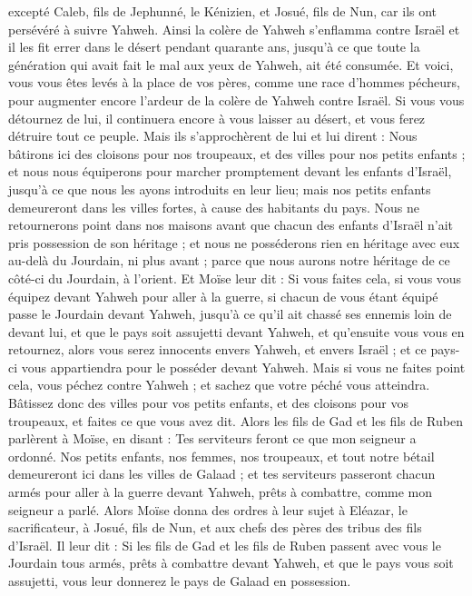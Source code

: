 \begin{multicols}{2}
excepté Caleb, fils de Jephunné, le Kénizien, et Josué, fils de Nun, car ils ont persévéré à suivre Yahweh.
Ainsi la colère de Yahweh s'enflamma contre Israël et il les fit errer dans le désert pendant quarante ans, jusqu'à ce que toute la génération qui avait fait le mal aux yeux de Yahweh, ait été consumée.
Et voici, vous vous êtes levés à la place de vos pères, comme une race d'hommes pécheurs, pour augmenter encore l'ardeur de la colère de Yahweh contre Israël.
Si vous vous détournez de lui, il continuera encore à vous laisser au désert, et vous ferez détruire tout ce peuple.
Mais ils s'approchèrent de lui et lui dirent : Nous bâtirons ici des cloisons pour nos troupeaux, et des villes pour nos petits enfants ;
et nous nous équiperons pour marcher promptement devant les enfants d'Israël, jusqu'à ce que nous les ayons introduits en leur lieu; mais nos petits enfants demeureront dans les villes fortes, à cause des habitants du pays.
Nous ne retournerons point dans nos maisons avant que chacun des enfants d'Israël n'ait pris possession de son héritage ;
et nous ne posséderons rien en héritage avec eux au-delà du Jourdain, ni plus avant ; parce que nous aurons notre héritage de ce côté-ci du Jourdain, à l'orient.
Et Moïse leur dit : Si vous faites cela, si vous vous équipez devant Yahweh pour aller à la guerre,
si chacun de vous étant équipé passe le Jourdain devant Yahweh, jusqu'à ce qu'il ait chassé ses ennemis loin de devant lui,
et que le pays soit assujetti devant Yahweh, et qu'ensuite vous vous en retournez, alors vous serez innocents envers Yahweh, et envers Israël ; et ce pays-ci vous appartiendra pour le posséder devant Yahweh.
Mais si vous ne faites point cela, vous péchez contre Yahweh ; et sachez que votre péché vous atteindra.
Bâtissez donc des villes pour vos petits enfants, et des cloisons pour vos troupeaux, et faites ce que vous avez dit.
Alors les fils de Gad et les fils de Ruben parlèrent à Moïse, en disant : Tes serviteurs feront ce que mon seigneur a ordonné.
Nos petits enfants, nos femmes, nos troupeaux, et tout notre bétail demeureront ici dans les villes de Galaad ;
et tes serviteurs passeront chacun armés pour aller à la guerre devant Yahweh, prêts à combattre, comme mon seigneur a parlé.
Alors Moïse donna des ordres à leur sujet à Eléazar, le sacrificateur, à Josué, fils de Nun, et aux chefs des pères des tribus des fils d'Israël.
Il leur dit : Si les fils de Gad et les fils de Ruben passent avec vous le Jourdain tous armés, prêts à combattre devant Yahweh, et que le pays vous soit assujetti, vous leur donnerez le pays de Galaad en possession.

\end{multicols}
